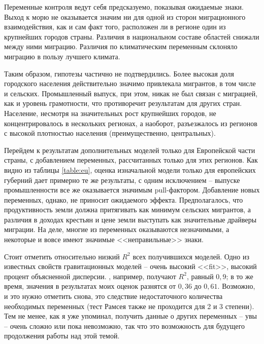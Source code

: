 \documentclass[a4paper,12pt]{article}
\begin{document}
Переменные контроля ведут себя предсказуемо, показывая ожидаемые знаки. Выход к морю не оказывается значим ни для одной из сторон миграционного взаимодействия, как и сам факт того, расположен ли в регионе один из крупнейших городов страны. Различия в национальном составе областей снижали между ними миграцию. Различия по климатическим переменным склоняло миграцию в пользу лучшего климата.

Таким образом, гипотезы частично не подтвердились. Более высокая доля городского населения действительно значимо привлекала мигрантов, в том числе и сельских. Промышленный выпуск, при этом, никак не был связан с миграцией, как и уровень грамотности, что противоречит результатам для других стран. %
Население, несмотря на значительных рост крупнейших городов, не концентрировалось в нескольких регионах, а наоборот, разъезжалось из регионов с высокой плотностью населения (преимущественно, центральных).


Перейдем к результатам дополнительных моделей только для Европейской части страны, с добавлением переменных, рассчитанных только для этих регионов. Как видно из таблицы \ref{table:eu}, оценка изначальной модели только для европейских губерний дает примерно те же результаты, с одним исключением -- выпуске промышленности все же оказывается значимым pull-фактором. Добавление новых переменных, однако, не приносит ожидаемого эффекта. Предполагалось, что продуктивность земли должна притягивать как минимум сельских мигрантов, а различия в доходах крестьян и цене земли выступать как значительные драйверы миграции. На деле, многие из переменных оказываются незначимыми, а некоторые и вовсе имеют значимые <<неправильные>> знаки. 

Стоит отметить относительно низкий $R^2$ всех получившихся моделей. Одно из известных свойств гравитационных моделей -- очень высокий <<fit>>, высокий процент объясненной дисперсии. \citeauthor{indonesia_2017}, например, получают $R^2$, равный $0,9$; в то же время, значения в результатах моих оценок разнятся от $0,36$ до $0,61$. Возможно, и это нужно отметить снова, это следствие недостаточного количества необходимых переменных (тест Рамсея также не проходится для 2 и 3 степени). Тем не менее, как я уже упоминал, получить данные о других переменных -- увы -- очень сложно или пока невозможно, так что это возможность для будущего продолжения работы над этой темой.
\end{document}
